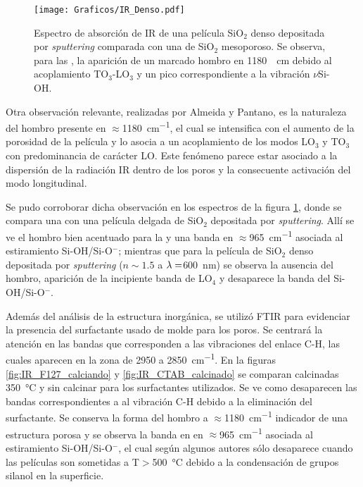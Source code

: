 		  \begin{figure}[!th]
						\begin{center}
						\texttt{[image: Graficos/IR\_Denso.pdf]}
						\caption[FTIR SiO$_2$ denso y SiO$_2$ mesoporoso.]{Espectro de absorción de IR de una película SiO$_2$ denso depositada por \textit{sputtering }comparada con una de SiO$_2$ mesoporoso. Se observa, para las \pdm, la aparición de un marcado hombro en \SI{1180}{\per\cm} debido al acoplamiento TO$_3$-LO$_3$ y un pico correspondiente a la vibración $\nu$Si-OH.}
						\label{fig:IR-denso}
						\end{center}
						\end{figure}

		 \pagebreak Otra observación relevante, realizadas por Almeida y Pantano\cite{Almeida1990}, es la naturaleza del hombro presente en $\approx$\SI{1180}{\cm^{-1}}, el cual se intensifica con el aumento de la porosidad de la película y lo asocia a un acoplamiento de los modos LO$_3$ y TO$_3$ con predominancia de carácter LO. Este fenómeno parece estar asociado a la dispersión de la radiación IR dentro de los poros y la consecuente activación del modo longitudinal.	
			
		 Se pudo corroborar dicha observación en los espectros de la figura \ref{fig:IR-denso}, donde se compara una \pdm\space con una película delgada de SiO$_2$ depositada por \textit{sputtering}.  Allí se ve el hombro bien acentuado para la \pdm\space y una banda en $\approx$\SI{965}{\cm^{-1}} asociada al estiramiento Si-OH/Si-O$^-$; mientras que para la película de SiO$_2$ denso depositada por \textit{sputtering} ($n\sim 1.5$ a $\lambda\index{longitud de onda}=$\SI{600}{\nm})\cite{Vergohl1999} se observa la ausencia del hombro, aparición de la incipiente banda de LO$_4$ y desaparece la banda del Si-OH/Si-O$^-$.

		 Además del análisis de la estructura inorgánica, se utilizó FTIR para evidenciar la presencia del surfactante usado de molde para los poros. Se centrará la atención en las bandas que corresponden a las vibraciones del enlace C-H, las cuales aparecen en la zona de 2950 a \SI{2850}{\cm^{-1}}. En la figuras \ref{fig:IR_F127_calciando} y \ref{fig:IR_CTAB_calcinado} se comparan \pdm\space calcinadas \SI{350}{\celsius} y sin calcinar para los surfactantes utilizados. Se ve como desaparecen las bandas correspondientes a al vibración C-H debido a la eliminación del surfactante. Se conserva la forma del hombro a $\approx$\SI{1180}{\cm^{-1}} indicador de una estructura porosa y se observa la banda en en $\approx$\SI{965}{\cm^{-1}} asociada al estiramiento Si-OH/Si-O$^-$, el cual según algunos autores sólo desaparece cuando las películas son sometidas a T$>$\SI{500}{\celsius} debido a la condensación de grupos silanol en la superficie.\cite{Innocenzi2003,Almeida1990,Bertoluzza1982}

